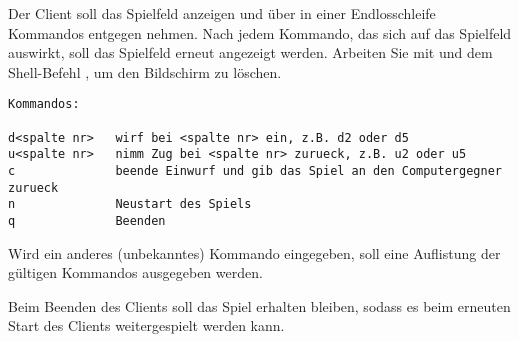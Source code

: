 Der Client soll das Spielfeld anzeigen und über  in einer
Endlosschleife Kommandos entgegen nehmen. Nach jedem Kommando, das sich auf das
Spielfeld auswirkt, soll das Spielfeld erneut angezeigt werden. Arbeiten Sie mit
 und dem Shell-Befehl , um den Bildschirm zu
löschen.

\begin{verbatim}
Kommandos:

d<spalte nr>   wirf bei <spalte nr> ein, z.B. d2 oder d5
u<spalte nr>   nimm Zug bei <spalte nr> zurueck, z.B. u2 oder u5
c              beende Einwurf und gib das Spiel an den Computergegner zurueck
n              Neustart des Spiels
q              Beenden
\end{verbatim}

Wird ein anderes (unbekanntes) Kommando eingegeben, soll eine Auflistung der
gültigen Kommandos ausgegeben werden.

Beim Beenden des Clients soll das Spiel erhalten bleiben, sodass es beim
erneuten Start des Clients weitergespielt werden kann.

\osueguidelinesthree


